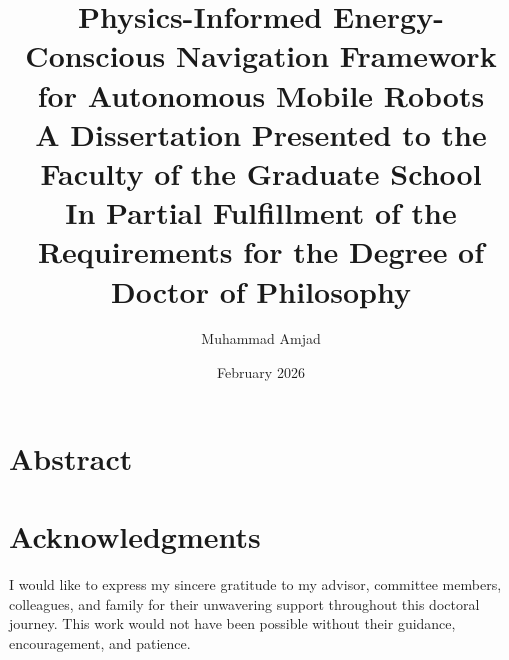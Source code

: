 \documentclass[12pt,twoside,openright]{report}
\title{
    \textbf{Physics-Informed Energy-Conscious Navigation Framework \\
    for Autonomous Mobile Robots}\\[1cm]
    \large A Dissertation Presented to the Faculty of the Graduate School\\
    In Partial Fulfillment of the Requirements for the Degree of\\
    \textbf{Doctor of Philosophy}
}
\author{Muhammad Amjad}
\date{February 2026}
\begin{document}
\maketitle

\chapter*{Abstract}


\chapter*{Acknowledgments}
I would like to express my sincere gratitude to my advisor, committee members, colleagues, and family for their unwavering support throughout this doctoral journey. This work would not have been possible without their guidance, encouragement, and patience.

\tableofcontents
\listoffigures
\listoftables
\printglossary[type=\acronymtype,title=List of Abbreviations]

\cleardoublepage
{}
\setcounter{page}{1}










\printbibliography[heading=bibintoc]

\appendix



\end{document}
